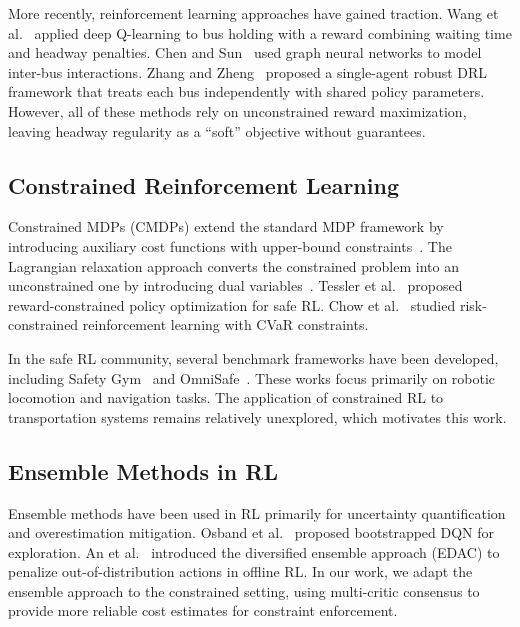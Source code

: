 \documentclass[10pt]{article}
\begin{document}
More recently, reinforcement learning approaches have gained traction. Wang et al.~\cite{Wang2020DynamicHolding} applied deep Q-learning to bus holding with a reward combining waiting time and headway penalties. Chen and Sun~\cite{Chen2021GraphRL} used graph neural networks to model inter-bus interactions. Zhang and Zheng~\cite{Zhang2025SingleAgentBus} proposed a single-agent robust DRL framework that treats each bus independently with shared policy parameters. However, all of these methods rely on unconstrained reward maximization, leaving headway regularity as a ``soft'' objective without guarantees.

\subsection{Constrained Reinforcement Learning}

Constrained MDPs (CMDPs) extend the standard MDP framework by introducing auxiliary cost functions with upper-bound constraints~\cite{Altman1999Constrained}. The Lagrangian relaxation approach converts the constrained problem into an unconstrained one by introducing dual variables~\cite{Stooke2020Responsive, Ray2019Benchmarking}. Tessler et al.~\cite{Tessler2019RewardConstrained} proposed reward-constrained policy optimization for safe RL. Chow et al.~\cite{Chow2017RiskConstrained} studied risk-constrained reinforcement learning with CVaR constraints.

In the safe RL community, several benchmark frameworks have been developed, including Safety Gym~\cite{Ray2019Benchmarking} and OmniSafe~\cite{Ji2023OmniSafe}. These works focus primarily on robotic locomotion and navigation tasks. The application of constrained RL to transportation systems remains relatively unexplored, which motivates this work.

\subsection{Ensemble Methods in RL}

Ensemble methods have been used in RL primarily for uncertainty quantification and overestimation mitigation. Osband et al.~\cite{Osband2016BootstrappedDQN} proposed bootstrapped DQN for exploration. An et al.~\cite{An2021UncertaintyEnsemble} introduced the diversified ensemble approach (EDAC) to penalize out-of-distribution actions in offline RL. In our work, we adapt the ensemble approach to the constrained setting, using multi-critic consensus to provide more reliable cost estimates for constraint enforcement.
\end{document}
